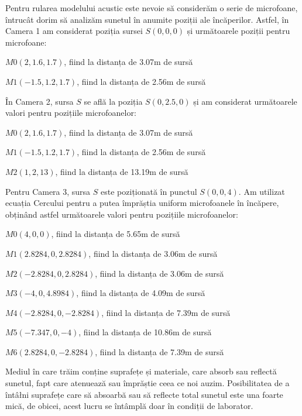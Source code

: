 	Pentru rularea modelului acustic este nevoie să considerăm o serie de microfoane, întrucât dorim să analizăm sunetul în anumite poziții ale încăperilor. Astfel, în Camera 1 am considerat poziția sursei $S(0, 0, 0)$ și următoarele poziții pentru microfoane:
	
	\begin{itemize}
		\utb $M0(2, 1.6, 1.7)$, fiind la distanța de 3.07m de sursă
		
		\utb $M1(-1.5, 1.2, 1.7)$, fiind la distanța de 2.56m de sursă
		
	\end{itemize}

	În Camera 2, sursa $S$ se află la poziția $S(0, 2.5, 0)$ și am considerat următoarele valori pentru pozițiile microfoanelor: 
	
	\begin{itemize}
		\utb $M0(2, 1.6, 1.7)$, fiind la distanța de 3.07m de sursă
		
		\utb $M1(-1.5, 1.2, 1.7)$, fiind la distanța de 2.56m de sursă
		
		\utb $M2(1, 2, 13)$, fiind la distanța de 13.19m de sursă
	\end{itemize}

	Pentru Camera 3, sursa $S$ este poziționată în punctul $S(0, 0, 4)$. Am utilizat ecuația Cercului pentru a putea împrăștia uniform microfoanele în încăpere, obținând astfel următoarele valori pentru pozițiile microfoanelor:
	
	\begin{itemize}
		\utb $M0(4, 0, 0)$, fiind la distanța de 5.65m de sursă
		
		\utb $M1(2.8284, 0, 2.8284)$, fiind la distanța de 3.06m de sursă
		
		\utb $M2(-2.8284, 0, 2.8284)$, fiind la distanța de 3.06m de sursă
		
		\utb $M3(-4, 0, 4.8984)$, fiind la distanța de 4.09m de sursă
		
		\utb $M4(-2.8284, 0, -2.8284)$, fiind la distanța de 7.39m de sursă
		
		\utb $M5(-7.347, 0, -4)$, fiind la distanța de 10.86m de sursă
		
		\utb $M6(2.8284, 0, -2.8284)$, fiind la distanța de 7.39m de sursă
	\end{itemize}


	Mediul în care trăim conține suprafețe și materiale, care absorb sau reflectă sunetul, fapt care atenuează sau împrăștie ceea ce noi auzim. Posibilitatea de a întâłni suprafețe care să absoarbă sau să reflecte total sunetul este una foarte mică, de obicei, acest lucru se întâmplă doar în condiții de laborator. 
	
